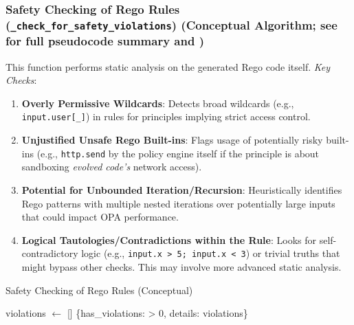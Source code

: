 \documentclass[sigconf,natbib]{acmart}
\makeatletter
\newcommand{\resetalglineno}{\setcounter{ALG@line}{0}}
\makeatother
\begin{document}
\subsubsection[Safety Checking of Rego Rules]{Safety Checking of Rego Rules (\texttt{\_check\_for\_safety\_violations}) (Conceptual Algorithm; see  for full pseudocode summary and )}
\label{app:safety_checking_subsection}
This function performs static analysis on the generated Rego code itself. \textit{Key Checks}:
\begin{enumerate}
    \item \textbf{Overly Permissive Wildcards}: Detects broad wildcards (e.g., \texttt{input.user[\_]}) in rules for principles implying strict access control.
    \item \textbf{Unjustified Unsafe Rego Built-ins}: Flags usage of potentially risky built-ins (e.g., \texttt{http.send} by the policy engine itself if the principle is about sandboxing \textit{evolved code's} network access).
    \item \textbf{Potential for Unbounded Iteration/Recursion}: Heuristically identifies Rego patterns with multiple nested iterations over potentially large inputs that could impact OPA performance.
    \item \textbf{Logical Tautologies/Contradictions within the Rule}: Looks for self-contradictory logic (e.g., \texttt{input.x > 5; input.x < 3}) or trivial truths that might bypass other checks. This may involve more advanced static analysis.
\end{enumerate}

\begin{algorithm}[!htbp]
\resetalglineno
\caption{Safety Checking of Rego Rules (Conceptual)}
\label{alg:safety_check_conceptual_appendix}
\begin{algorithmic}[1]
  \State violations $\gets$ []
    \State {}
  \EndIf
    \State {}
  \EndIf
    \State {}
  \EndIf
  \State \Return \{has\_violations:  > 0, details: violations\}
\EndFunction
\end{algorithmic}
\end{algorithm}
\end{document}
